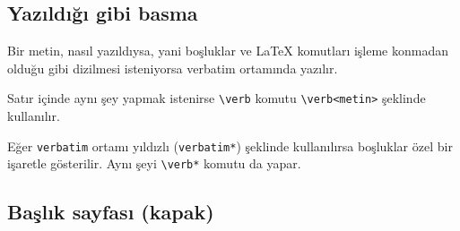 \documentclass[
  letterpaper,
  DIV=11,
  numbers=noendperiod]{scrreprt}
\newenvironment{Shaded}{\begin{snugshade}}{\end{snugshade}}
\newcommand{\BuiltInTok}[1]{\textcolor[rgb]{0.00,0.23,0.31}{#1}}
\newcommand{\ExtensionTok}[1]{\textcolor[rgb]{0.00,0.23,0.31}{#1}}
\newcommand{\FunctionTok}[1]{\textcolor[rgb]{0.28,0.35,0.67}{#1}}
\newcommand{\KeywordTok}[1]{\textcolor[rgb]{0.00,0.23,0.31}{#1}}
\newcommand{\NormalTok}[1]{\textcolor[rgb]{0.00,0.23,0.31}{#1}}
\newcommand{\VerbatimStringTok}[1]{\textcolor[rgb]{0.13,0.47,0.30}{#1}}
\begin{document}
\hypertarget{yazux131ldux131ux11fux131-gibi-basma}{%
\subsection{Yazıldığı gibi
basma}\label{yazux131ldux131ux11fux131-gibi-basma}}

Bir metin, nasıl yazıldıysa, yani boşluklar ve {\LaTeX} komutları işleme
konmadan olduğu gibi dizilmesi isteniyorsa verbatim ortamında yazılır.

Satır içinde aynı şey yapmak istenirse \texttt{\textbackslash{}verb}
komutu
\texttt{\textbackslash{}verb\textbar{}\textless{}metin\textgreater{}\textbar{}}
şeklinde kullanılır.

Eğer \texttt{verbatim} ortamı yıldızlı (\texttt{verbatim*}) şeklinde
kullanılırsa boşluklar özel bir işaretle gösterilir. Aynı şeyi
\texttt{\textbackslash{}verb*} komutu da yapar.

\begin{Shaded}
\end{Shaded}

\hypertarget{baux15flux131k-sayfasux131-kapak}{%
\subsection{Başlık sayfası
(kapak)}\label{baux15flux131k-sayfasux131-kapak}}
\end{document}
